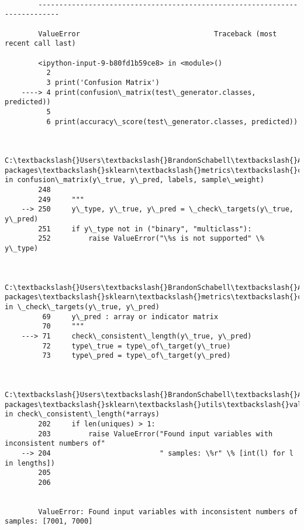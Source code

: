 \documentclass[11pt]{article}
\begin{document}
    \begin{Verbatim}[commandchars=\\\{\}]

        ---------------------------------------------------------------------------

        ValueError                                Traceback (most recent call last)

        <ipython-input-9-b80fd1b59ce8> in <module>()
          2 
          3 print('Confusion Matrix')
    ----> 4 print(confusion\_matrix(test\_generator.classes, predicted))
          5 
          6 print(accuracy\_score(test\_generator.classes, predicted))
    

        C:\textbackslash{}Users\textbackslash{}BrandonSchabell\textbackslash{}AppData\textbackslash{}Local\textbackslash{}Programs\textbackslash{}Python\textbackslash{}Python36\textbackslash{}lib\textbackslash{}site-packages\textbackslash{}sklearn\textbackslash{}metrics\textbackslash{}classification.py in confusion\_matrix(y\_true, y\_pred, labels, sample\_weight)
        248 
        249     """
    --> 250     y\_type, y\_true, y\_pred = \_check\_targets(y\_true, y\_pred)
        251     if y\_type not in ("binary", "multiclass"):
        252         raise ValueError("\%s is not supported" \% y\_type)
    

        C:\textbackslash{}Users\textbackslash{}BrandonSchabell\textbackslash{}AppData\textbackslash{}Local\textbackslash{}Programs\textbackslash{}Python\textbackslash{}Python36\textbackslash{}lib\textbackslash{}site-packages\textbackslash{}sklearn\textbackslash{}metrics\textbackslash{}classification.py in \_check\_targets(y\_true, y\_pred)
         69     y\_pred : array or indicator matrix
         70     """
    ---> 71     check\_consistent\_length(y\_true, y\_pred)
         72     type\_true = type\_of\_target(y\_true)
         73     type\_pred = type\_of\_target(y\_pred)
    

        C:\textbackslash{}Users\textbackslash{}BrandonSchabell\textbackslash{}AppData\textbackslash{}Local\textbackslash{}Programs\textbackslash{}Python\textbackslash{}Python36\textbackslash{}lib\textbackslash{}site-packages\textbackslash{}sklearn\textbackslash{}utils\textbackslash{}validation.py in check\_consistent\_length(*arrays)
        202     if len(uniques) > 1:
        203         raise ValueError("Found input variables with inconsistent numbers of"
    --> 204                          " samples: \%r" \% [int(l) for l in lengths])
        205 
        206 
    

        ValueError: Found input variables with inconsistent numbers of samples: [7001, 7000]

    \end{Verbatim}


    
    
    
    
\end{document}
